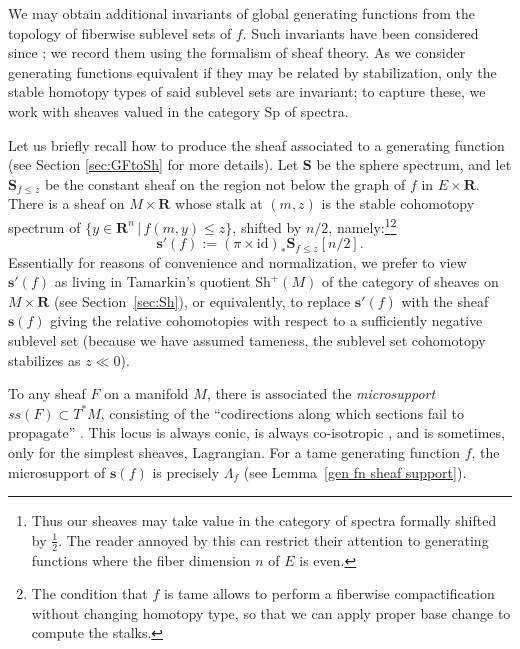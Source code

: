 \documentclass[12pt,a4paper]{article}
\numberwithin{equation}{section}
\theoremstyle{definition}
\theoremstyle{remark}
\newcommand{\Sp}{\mathrm{Sp}}
\newcommand{\R}{\mathbf{R}}
\newcommand{\s}{\mathbf{s}}
\newcommand{\Sh}{\mathrm{Sh}}
\renewcommand{\S}{\mathbf{S}}
\newcommand{\id}{\mathrm{id}}
\begin{document}
\vspace{2mm}

We may obtain additional invariants of global generating functions from the topology of fiberwise sublevel sets of $f$.  Such invariants have been considered since \cite{Viterbo}; we record them using the formalism of sheaf theory.  As we consider generating functions equivalent if they may be related by stabilization, only the stable homotopy types of said sublevel sets are invariant; to capture these, we work with sheaves valued in the category $\Sp$ of spectra.

Let us briefly recall how to produce the sheaf associated to a generating function (see Section \ref{sec:GFtoSh} for more details).  Let $\S$ be the sphere spectrum, and let $\S_{f \le z}$ be the constant sheaf on the  region not below the graph of $f$ in $E \times \R$.  There is a sheaf
on $M \times \R$ whose stalk at $(m, z)$ is the stable cohomotopy spectrum of $\{ y \in \R^n \,|\, f(m, y) \le z\}$, shifted by $n/2$, namely:\footnote{Thus our sheaves may take value in the category of spectra formally shifted by $\frac{1}{2}$. The reader annoyed by this can  restrict their attention to generating functions where the fiber dimension $n$ of $E$ is even.}\footnote{The condition that $f$ is tame allows to perform a fiberwise compactification without changing homotopy  type, so that we can apply proper base change to compute the stalks.}
$$\s'(f) := (\pi\times \id)_* \S_{f \le z}[n/2].$$
Essentially for reasons of convenience and normalization, we prefer to view $\s'(f)$ as living
in Tamarkin's quotient $\Sh^+(M)$  of the category of sheaves on $M\times \R$ (see Section~\ref{sec:Sh}), or equivalently, to replace $\s'(f)$  with the sheaf $\s(f)$ giving the relative cohomotopies with respect to a sufficiently negative sublevel set (because we have assumed tameness, the sublevel set cohomotopy stabilizes as $z \ll 0$).


To any sheaf $F$ on a manifold $M$, there is associated the {\em microsupport} $ss(F) \subset T^*M$, consisting of the ``codirections along which sections fail to propagate'' \cite{Kashiwara-Schapira}.  This locus is always conic, is always co-isotropic \cite[Thm. 6.5.4]{Kashiwara-Schapira}, and is sometimes, only for the simplest sheaves, Lagrangian.
For a tame generating function $f$, the microsupport of $\s(f)$ is precisely $\Lambda_f$ (see Lemma~\ref{gen fn sheaf support}).
\end{document}
